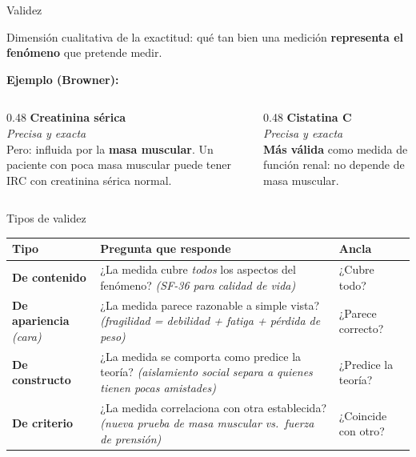 \documentclass[aspectratio=169, 12pt, xcolor=table]{beamer}
\begin{document}
\begin{frame}{Validez}
  \begin{definicion}[Validez]
    Dimensión cualitativa de la exactitud: qué tan bien una medición
    \textbf{representa el fenómeno} que pretende medir.
  \end{definicion}

  \vspace{4pt}
  \textbf{Ejemplo (Browner):}

  {\small
  \begin{columns}[T]
    \begin{column}{0.48\textwidth}
      \textbf{Creatinina sérica}\\
      \textit{Precisa y exacta}\\[2pt]
      Pero: influida por la \textbf{masa muscular}.
      Un paciente con poca masa muscular puede tener
      IRC con creatinina sérica normal.
    \end{column}
    \begin{column}{0.48\textwidth}
      \textbf{Cistatina C}\\
      \textit{Precisa y exacta}\\[2pt]
      \textbf{Más válida} como medida de función renal:
      no depende de masa muscular.
    \end{column}
  \end{columns}
  }
\end{frame}

\begin{frame}{Tipos de validez}
  \footnotesize
  \begin{tabular}{p{3.2cm} p{6.7cm} p{2.1cm}}
    \toprule
    \textbf{Tipo} & \textbf{Pregunta que responde} & \textbf{Ancla} \\
    \midrule
    \textbf{De contenido} &
      ¿La medida cubre \textit{todos} los aspectos del fenómeno?
      \textit{(SF-36 para calidad de vida)} &
      ¿Cubre todo? \\[3pt]
    \textbf{De apariencia} \textit{(cara)} &
      ¿La medida parece razonable a simple vista?
      \textit{(fragilidad = debilidad + fatiga + pérdida de peso)} &
      ¿Parece correcto? \\[3pt]
    \textbf{De constructo} &
      ¿La medida se comporta como predice la teoría?
      \textit{(aislamiento social separa a quienes tienen pocas amistades)} &
      ¿Predice la teoría? \\[3pt]
    \textbf{De criterio} &
      ¿La medida correlaciona con otra establecida?
      \textit{(nueva prueba de masa muscular vs.\ fuerza de prensión)} &
      ¿Coincide con otro? \\
    \bottomrule
  \end{tabular}
\end{frame}
\end{document}
